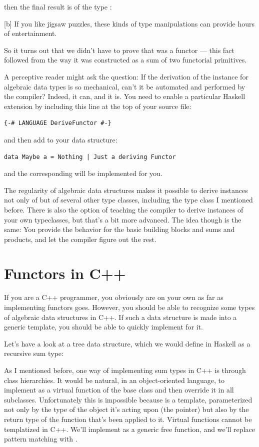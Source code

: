 then the final result is of the type
:

[b]
If you like jigsaw puzzles, these kinds of type manipulations can
provide hours of entertainment.

So it turns out that we didn't have to prove that  was a
functor --- this fact followed from the way it was constructed as a sum
of two functorial primitives.

A perceptive reader might ask the question: If the derivation of the
 instance for algebraic data types is so mechanical,
can't it be automated and performed by the compiler? Indeed, it can, and
it is. You need to enable a particular Haskell extension by including
this line at the top of your source file:

\begin{Verbatim}
{-# LANGUAGE DeriveFunctor #-}
\end{Verbatim}
and then add  to your data structure:

\begin{Verbatim}
data Maybe a = Nothing | Just a deriving Functor
\end{Verbatim}
and the corresponding  will be implemented for you.

The regularity of algebraic data structures makes it possible to derive
instances not only of  but of several other type
classes, including the  type class I mentioned before. There
is also the option of teaching the compiler to derive instances of your
own typeclasses, but that's a bit more advanced. The idea though is the
same: You provide the behavior for the basic building blocks and sums
and products, and let the compiler figure out the rest.

\section{Functors in C++}

If you are a C++ programmer, you obviously are on your own as far as
implementing functors goes. However, you should be able to recognize
some types of algebraic data structures in C++. If such a data structure
is made into a generic template, you should be able to quickly implement
 for it.

Let's have a look at a tree data structure, which we would define in
Haskell as a recursive sum type:

As I mentioned before, one way of implementing sum types in C++ is
through class hierarchies. It would be natural, in an object-oriented
language, to implement  as a virtual function of the base
class  and then override it in all subclasses.
Unfortunately this is impossible because  is a template,
parameterized not only by the type of the object it's acting upon (the
 pointer) but also by the return type of the function
that's been applied to it. Virtual functions cannot be templatized in
C++. We'll implement  as a generic free function, and we'll
replace pattern matching with .

